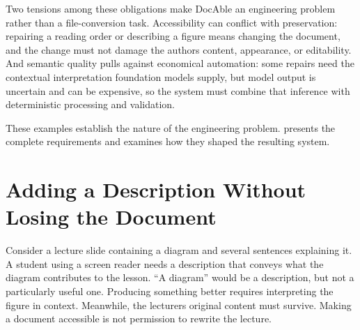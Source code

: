 Two tensions among these obligations make DocAble an engineering problem rather than a file-conversion task. Accessibility can conflict with preservation: repairing a reading order or describing a figure means changing the document, and the change must not damage the author\textquotesingle s content, appearance, or editability. And semantic quality pulls against economical automation: some repairs need the contextual interpretation foundation models supply, but model output is uncertain and can be expensive, so the system must combine that inference with deterministic processing and validation.


These examples establish the nature of the engineering problem.  presents the complete requirements and examines how they shaped the resulting system.

\section{Adding a Description Without Losing the Document}\label{heading:adding-a-description-without-losing-the-document}


Consider a lecture slide containing a diagram and several sentences explaining it. A student using a screen reader needs a description that conveys what the diagram contributes to the lesson. ``A diagram'' would be a description, but not a particularly useful one. Producing something better requires interpreting the figure in context. Meanwhile, the lecturer\textquotesingle s original content must survive. Making a document accessible is not permission to rewrite the lecture.


